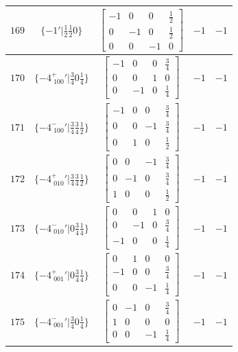 \documentclass[fleqn,8pt]{jsarticle}
\begin{document}
\begin{longtable}{ccccc}
$ 169 $ & $ \{-1{}'|\frac{1}{2} \frac{1}{2} 0\} $ & $ \begin{bmatrix} -1 & 0 & 0 & \frac{1}{2} \\ 0 & -1 & 0 & \frac{1}{2} \\ 0 & 0 & -1 & 0 \end{bmatrix} $ & $ -1 $ & $ -1 $ \\ \hline
$ 170 $ & $ \{-4^{+}_{\,\,100}{}'|\frac{3}{4} 0 \frac{1}{4}\} $ & $ \begin{bmatrix} -1 & 0 & 0 & \frac{3}{4} \\ 0 & 0 & 1 & 0 \\ 0 & -1 & 0 & \frac{1}{4} \end{bmatrix} $ & $ -1 $ & $ -1 $ \\ \hline
$ 171 $ & $ \{-4^{-}_{\,\,100}{}'|\frac{3}{4} \frac{3}{4} \frac{1}{2}\} $ & $ \begin{bmatrix} -1 & 0 & 0 & \frac{3}{4} \\ 0 & 0 & -1 & \frac{3}{4} \\ 0 & 1 & 0 & \frac{1}{2} \end{bmatrix} $ & $ -1 $ & $ -1 $ \\ \hline
$ 172 $ & $ \{-4^{+}_{\,\,010}{}'|\frac{3}{4} \frac{3}{4} \frac{1}{2}\} $ & $ \begin{bmatrix} 0 & 0 & -1 & \frac{3}{4} \\ 0 & -1 & 0 & \frac{3}{4} \\ 1 & 0 & 0 & \frac{1}{2} \end{bmatrix} $ & $ -1 $ & $ -1 $ \\ \hline
$ 173 $ & $ \{-4^{-}_{\,\,010}{}'|0 \frac{3}{4} \frac{1}{4}\} $ & $ \begin{bmatrix} 0 & 0 & 1 & 0 \\ 0 & -1 & 0 & \frac{3}{4} \\ -1 & 0 & 0 & \frac{1}{4} \end{bmatrix} $ & $ -1 $ & $ -1 $ \\ \hline
$ 174 $ & $ \{-4^{+}_{\,\,001}{}'|0 \frac{3}{4} \frac{1}{4}\} $ & $ \begin{bmatrix} 0 & 1 & 0 & 0 \\ -1 & 0 & 0 & \frac{3}{4} \\ 0 & 0 & -1 & \frac{1}{4} \end{bmatrix} $ & $ -1 $ & $ -1 $ \\ \hline
$ 175 $ & $ \{-4^{-}_{\,\,001}{}'|\frac{3}{4} 0 \frac{1}{4}\} $ & $ \begin{bmatrix} 0 & -1 & 0 & \frac{3}{4} \\ 1 & 0 & 0 & 0 \\ 0 & 0 & -1 & \frac{1}{4} \end{bmatrix} $ & $ -1 $ & $ -1 $ \\ \hline

\end{longtable}
\end{document}
